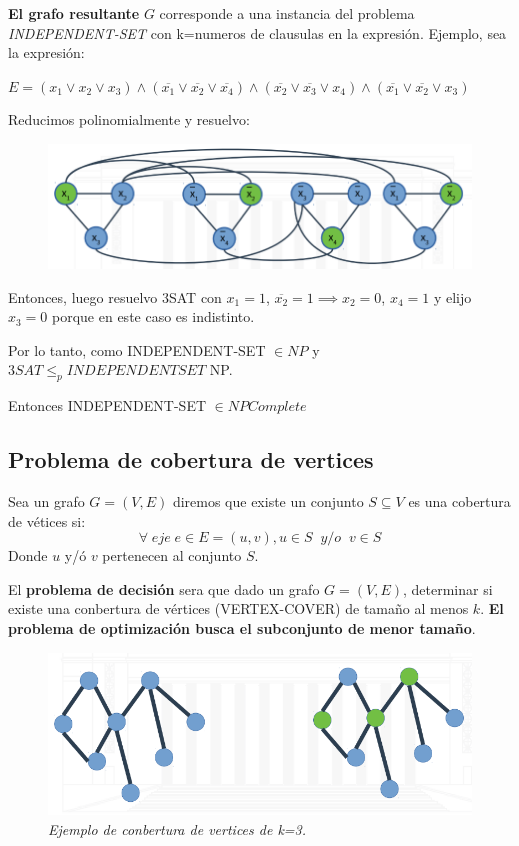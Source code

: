 \documentclass{article}
\begin{document}
\textbf{El grafo resultante }\(G\) corresponde a una instancia del problema \textit{INDEPENDENT-SET} 
con k=numeros de clausulas en la expresión. Ejemplo, sea la expresión:

\(E=(x_1 \lor x_2 \lor x_3) \land (\overline{x_1} \lor \overline{x_2} \lor \overline{x_4}) 
    \land (\overline{x_2} \lor \overline{x_3} \lor x_4) 
    \land (\overline{x_1} \lor \overline{x_2} \lor x_3)\)

Reducimos polinomialmente y resuelvo:
\begin{figure}[h!]
    \includegraphics[scale=0.4]{imagenes/ejemplo-reduccion-3sat.png}
\end{figure}

Entonces, luego resuelvo 3SAT con \(x_1 = 1\), \(\overline{x_2} = 1 \implies x_2=0\), 
\(x_4=1\) y elijo \(x_3=0\) porque en este caso es indistinto.

Por lo tanto, como INDEPENDENT-SET \(\in NP\) y \(3SAT \leq_p INDEPENDENTSET\) NP.

Entonces INDEPENDENT-SET \(\in NPComplete\)

\newpage
\subsection{Problema de cobertura de vertices}
Sea un grafo \(G=(V,E)\) diremos que existe un conjunto \(S \subseteq V\) es una cobertura de vétices si:
\[
    \forall \;eje\; e \in E=(u,v), u\in S \;\; y/o \;\; v \in S
\]
Donde \(u\) y/ó \(v\) pertenecen al conjunto \(S\).

El \textbf{problema de decisión} sera que dado un grafo \(G=(V,E)\), determinar si existe una conbertura
de vértices (VERTEX-COVER) de tamaño al menos \(k\). 
\textbf{El problema de optimización busca el subconjunto de menor tamaño}.


\begin{figure}[h!]
    \begin{center} 
    \includegraphics[width=\linewidth]{imagenes/ejemplo-cobertura-v-k3.png}
    \caption{\small \sl Ejemplo de conbertura de vertices de k=3.\label{fig:Stupendous}} 
    \end{center}
\end{figure}
\end{document}
